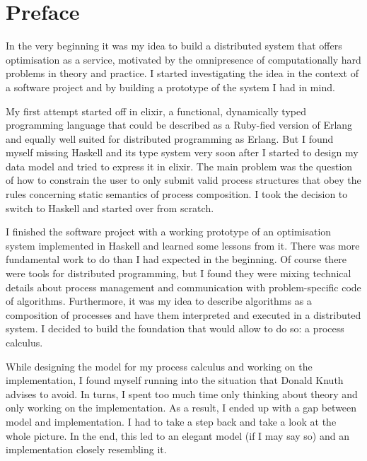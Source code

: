 $\;$
\clearpage
\renewcommand*{\dictumwidth}{.6\textwidth}

\section*{Preface}
In the very beginning it was my idea to build a distributed system that offers optimisation as a service, motivated by the omnipresence of computationally hard problems in theory and practice. I started investigating the idea in the context of a software project and by building a prototype of the system I had in mind.

My first attempt started off in \textsf{elixir}, a functional, dynamically typed programming language that could be described as a \textsf{Ruby}-fied version of \textsf{Erlang} and equally well suited for distributed programming as \textsf{Erlang}. But I found myself missing \textsf{Haskell} and its type system very soon after I started to design my data model and tried to express it in \textsf{elixir}. The main problem was the question of how to constrain the user to only submit valid process structures that obey the rules concerning static semantics of process composition. I took the decision to switch to \textsf{Haskell} and started over from scratch.

I finished the software project with a working prototype of an optimisation system implemented in \textsf{Haskell} and learned some lessons from it. There was more fundamental work to do than I had expected in the beginning. Of course there were tools for distributed programming, but I found they were mixing technical details about process management and communication with problem-specific code of algorithms. Furthermore, it was my idea to describe algorithms as a composition of processes and have them interpreted and executed in a distributed system. I decided to build the foundation that would allow to do so: a process calculus.

While designing the model for my process calculus and working on the implementation, I found myself running into the situation that Donald Knuth advises to avoid. In turns, I spent too much time only thinking about theory and only working on the implementation. As a result, I ended up with a gap between model and implementation. I had to take a step back and take a look at the whole picture. In the end, this led to an elegant model (if I may say so) and an implementation closely resembling it.

